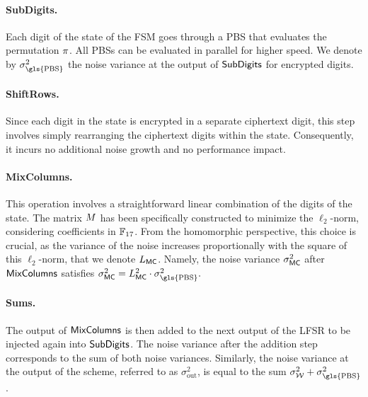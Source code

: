 \paragraph{SubDigits.} Each digit of the state of the FSM goes through a \gls{PBS} that evaluates the permutation $\pi$. All PBSs can be evaluated in parallel for higher speed. We denote by $\sigma_{\text{\gls{PBS}}}^2$ the noise variance at the output of $\text{\textsf{SubDigits}}$ for encrypted digits.


\paragraph{ShiftRows.} Since each digit in the state is encrypted in a separate ciphertext digit, this step involves simply rearranging the ciphertext digits within the state. Consequently, it incurs no additional noise growth and no performance impact.

\paragraph{MixColumns.} This operation involves a straightforward linear combination of the digits of the state. The matrix $M$ has been specifically constructed to minimize the $\ell_2$-norm, considering coefficients in $\mathbb{F}_{17}$. %
From the homomorphic perspective, this choice is crucial, as the variance of the noise increases proportionally with the square of this $\ell_2$-norm, that we denote $L_{\text{\textsf{MC}}}$. Namely, the noise variance $\sigma^2_{\text{\textsf{MC}}}$ after  $\text{\textsf{MixColumns}}$ satisfies $\sigma^2_\mixC = L_{\mixC }^2 \cdot \sigma_{\text{\gls{PBS}}}^2.$


\paragraph{Sums.} The output of $\text{\textsf{MixColumns}}$ is then added to the next output of the LFSR to be injected again into $\text{\textsf{SubDigits}}$. The noise variance after the addition step corresponds to the sum of both noise variances. Similarly, the noise variance at the output of the scheme, referred to as $\sigma^2_{\text{out}}$, is equal to the sum $\sigma_\whitening^2 + \sigma_{\text{\gls{PBS}}}^2$.





